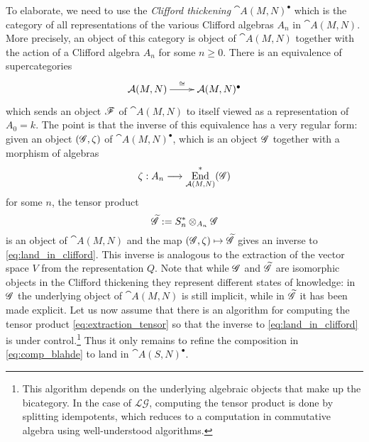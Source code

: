 \documentclass[english,letter paper,12pt,reqno]{article}
\theoremstyle{example}
\numberwithin{equation}{section}
\def\LG{\mathcal{LG}}
\DeclareMathOperator{\End}{End}
\begin{document}
To elaborate, we need to use the \emph{Clifford thickening} $\cat{A}(M,N)^\bullet$ which is the category of all representations of the various Clifford algebras $A_n$ in $\cat{A}(M,N)$. More precisely, an object of this category is object of $\cat{A}(M,N)$ together with the action of a Clifford algebra $A_n$ for some $n \ge 0$. There is an equivalence of supercategories
\begin{equation}\label{eq:land_in_clifford}
\xymatrix{
\cat{A}(M,N) \ar[r]^-{\cong} & \cat{A}(M,N)^\bullet 
}
\end{equation}
which sends an object $\mathscr{F}$ of $\cat{A}(M,N)$ to itself viewed as a representation of $A_0 = k$. The point is that the inverse of this equivalence has a very regular form: given an object $(\mathscr{G}, \zeta)$ of $\cat{A}(M,N)^\bullet$, which is an object $\mathscr{G}$ together with a morphism of algebras
\[
\zeta: A_n \lto \End^*_{\cat{A}(M,N)}( \md{G} )
\]
for some $n$, the tensor product
\begin{equation}\label{eq:extraction_tensor}
\widetilde{\mathscr{G}} := S_n^* \otimes_{A_n} \mathscr{G}
\end{equation}
is an object of $\cat{A}(M,N)$ and the map $(\mathscr{G}, \zeta) \mapsto \widetilde{\mathscr{G}}$ gives an inverse to \eqref{eq:land_in_clifford}. This inverse is analogous to the extraction of the vector space $V$ from the representation $Q$. Note that while $\mathscr{G}$ and $\widetilde{\mathscr{G}}$ are isomorphic objects in the Clifford thickening they represent different states of knowledge: in $\mathscr{G}$ the underlying object of $\cat{A}(M,N)$ is still implicit, while in $\widetilde{\mathscr{G}}$ it has been made explicit. Let us now assume that there is an algorithm for computing the tensor product \eqref{eq:extraction_tensor} so that the inverse to \eqref{eq:land_in_clifford} is under control.\footnote{This algorithm depends on the underlying algebraic objects that make up the bicategory. In the case of $\LG$, computing the tensor product is done by splitting idempotents, which reduces to a computation in commutative algebra using well-understood algorithms.} Thus it only remains to refine the composition in \eqref{eq:comp_blahde} to land in $\cat{A}(S,N)^\bullet$.
\end{document}
